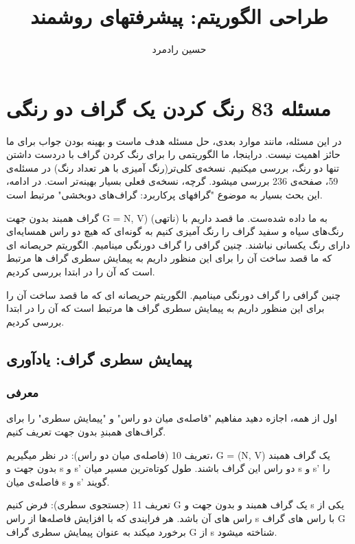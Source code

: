 \documentclass{book} %
\begin{document}

\title{طراحی الگوریتم: پیشرفتهای روشمند}
\author{حسین رادمرد}

\maketitle

\section{مسئله 83 رنگ کردن یک گراف دو رنگی}

در این مسئله، مانند موارد بعدی، حل مسئله هدف ماست و بهینه بودن جواب برای ما حائز اهمیت نیست. دراینجا، ما الگوریتمی را برای رنگ کردن گراف با دردست داشتن تنها دو رنگ، بررسی میکنیم. نسخه‌ی کلی‌تر(رنگ آمیزی با هر تعداد رنگ) در مسئله‌ی 59، صفحه‌ی 236 بررسی میشود. گرچه، نسخه‌ی فعلی بسیار بهینه‌تر است. در ادامه، این بحث بسیار به موضوع "گرافهای پرکاربرد: گراف‌های دوبخشی" مرتبط است.

گراف همبند بدون جهت 
{G = N, V)}\lr
 (ناتهی) به ما داده شده‌ست. ما قصد داریم با رنگ‌های سیاه و سفید گراف را رنگ آمیزی کنیم به گونه‌ای که هیچ دو راس همسایه‌ای دارای رنگ یکسانی نباشند. چنین گرافی را گراف دورنگی مینامیم. الگوریتم حریصانه ای که ما قصد ساخت آن را برای این منظور داریم به پیمایش سطری گراف ها مرتبط است که آن را در ابتدا بررسی کردیم.


 چنین گرافی را گراف دورنگی مینامیم. الگوریتم حریصانه ای که ما قصد ساخت آن را برای این منظور داریم به پیمایش سطری گراف ها مرتبط است که آن را در ابتدا بررسی کردیم.
\subsection*{پیمایش سطری گراف: یادآوری}
\subsubsection*{معرفی}

اول از همه، اجازه دهید مفاهیم "فاصله‌ی میان دو راس" و "پیمایش سطری" را برای گراف‌های همبندِ بدون جهت تعریف کنیم.

تعریف 10 (فاصله‌ی میان دو راس):
در نظر میگیریم، G = (N, V) یک گراف همبند بدون جهت و s و s' دو راس این گراف باشند. طول کوتاه‌ترین مسیر میان s و s' را فاصله‌ی میان s و s' گویند.


تعریف 11 (جستجوی سطری):
فرض کنیم G یک گراف همبند و بدون جهت و s یکی از راس های آن باشد. هر فرایندی که با افزایش فاصله‌ها از راس s با راس های گراف G برخورد میکند به عنوان پیمایش سطری گراف G از s شناخته میشود.  
\end{document}

